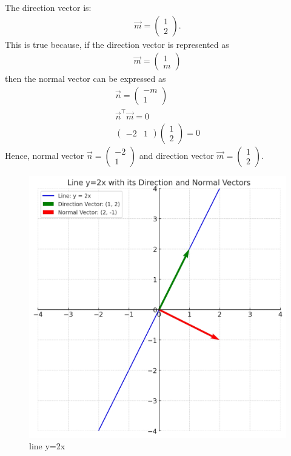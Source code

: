 \documentclass[journal]{IEEEtran}
\begin{document}
The direction vector is:
\begin{align}
\vec{m} = \begin{pmatrix} 1 \\ 2 \end{pmatrix}.
\end{align}
This is true because, if the direction vector is represented as
\begin{align}
\vec{m} = \begin{pmatrix} 1 \\ m \end{pmatrix}
\end{align}
then the normal vector can be expressed as
\begin{align}
  \vec{n} = \begin{pmatrix} -m \\ 1 \end{pmatrix} \\
  \vec{n}^\top \vec{m} =0\\
   \begin{pmatrix} -2 & 1 \end{pmatrix}\begin{pmatrix} 1 \\ 2 \end{pmatrix}=0
\end{align}
Hence, normal vector $\vec{n} = \begin{pmatrix} -2 \\ 1 \end{pmatrix}$ and direction vector  $\vec{m} = \begin{pmatrix} 1 \\ 2 \end{pmatrix}$.

\begin{figure}[H]
    \centering
    \includegraphics[width=0.75\columnwidth]{figs/graph-6.jpg}
    \caption{line y=2x}
    \label{fig:placeholder}
\end{figure}
\end{document}

